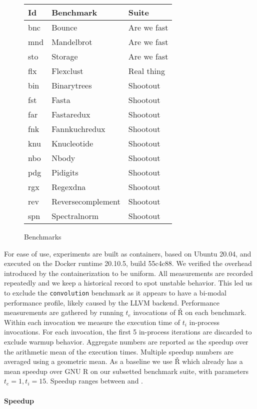 \documentclass[review,creen,acmsmall]{acmart}
\renewcommand{\Rsh}{{\sf\v R}\xspace}
\begin{document}
\begin{wrapfigure}{r}{6cm}
  \small
  \caption{Benchmarks}\label{table:bms}
  \begin{tabular}{lll}
    \toprule
    \bf Id&\bf Benchmark&\bf Suite\\
    \midrule
    bnc&Bounce&Are we fast\\
    mnd&Mandelbrot&Are we fast\\
    sto&Storage&Are we fast\\
    flx&Flexclust&Real thing\\
    bin&Binarytrees&Shootout\\
    fst&Fasta&Shootout\\
    far&Fastaredux&Shootout\\
    fnk&Fannkuchredux&Shootout\\
    knu&Knucleotide&Shootout\\
    nbo&Nbody&Shootout\\
    pdg&Pidigits&Shootout\\
    rgx&Regexdna&Shootout\\
    rev&Reversecomplement&Shootout\\
    spn&Spectralnorm&Shootout\\
    \bottomrule
  \end{tabular}
\end{wrapfigure}

For ease of use, experiments are built as containers, based on Ubuntu 20.04, and
executed on the Docker runtime 20.10.5, build 55c4c88. We verified the overhead
introduced by the containerization to be uniform. All measurements are recorded
repeatedly and we keep a historical record to spot unstable behavior. This led
us to exclude the \lstinline{convolution} benchmark as it appears to have a
bi-modal performance profile, likely caused by the LLVM backend. Performance
measurements are gathered by running $t_e$ invocations of \Rsh on each
benchmark. Within each invocation we measure the execution time of $t_i$
in-process invocations. For each invocation, the first 5 in-process iterations
are discarded to exclude warmup behavior. Aggregate numbers are reported as the
speedup over the arithmetic mean of the execution times. Multiple speedup
numbers are averaged using a geometric mean. As a baseline we use \Rsh which
already has a \speedupRsh mean speedup over GNU R on our subsetted benchmark
suite, with parameters $t_e = 1, t_i = 15$. Speedup ranges between
\speedupRshMin and \speedupRshMax.

\paragraph{Speedup}
\end{document}
